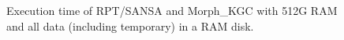 \begin{figure}
    \centering
    \qquad
    \caption{Execution time of RPT/SANSA and Morph\_KGC with 512G RAM and all data (including temporary) in a RAM disk.}
    \label{fig:eval-chart-execution-time}
\end{figure}



